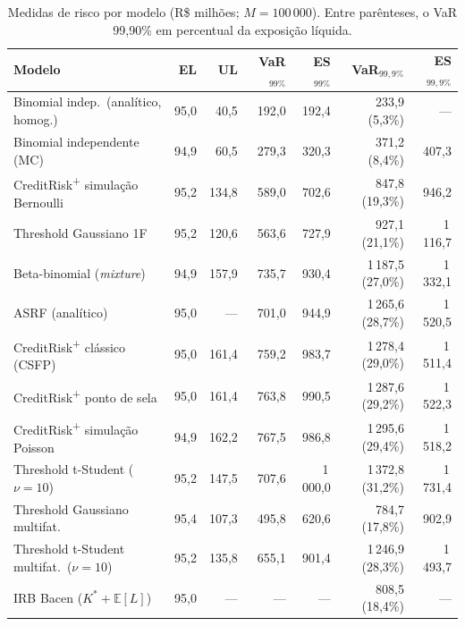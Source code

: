 \documentclass[11pt,a4paper]{article}
\newcommand{\E}{\mathbb{E}}
\begin{document}
\begin{table}[htb]
\centering\small
\caption{Medidas de risco por modelo (R\$ milhões; $M=100\,000$). Entre parênteses, o VaR 99{,}90\% em percentual da exposição líquida.}
\label{tab:medidas}
\setlength{\tabcolsep}{4.5pt}
\begin{tabular}{lrrrrrr}
\toprule
Modelo & EL & UL & VaR$_{99\%}$ & ES$_{99\%}$ & VaR$_{99,9\%}$ & ES$_{99,9\%}$ \\
\midrule
Binomial indep.\ (analítico, homog.) & 95{,}0 & 40{,}5 & 192{,}0 & 192{,}4 & 233{,}9 \;(5{,}3\%) & --- \\
Binomial independente (MC) & 94{,}9 & 60{,}5 & 279{,}3 & 320{,}3 & 371{,}2 \;(8{,}4\%) & 407{,}3 \\
CreditRisk\textsuperscript{+} simulação Bernoulli & 95{,}2 & 134{,}8 & 589{,}0 & 702{,}6 & 847{,}8 \;(19{,}3\%) & 946{,}2 \\
Threshold Gaussiano 1F & 95{,}2 & 120{,}6 & 563{,}6 & 727{,}9 & 927{,}1 \;(21{,}1\%) & 1\,116{,}7 \\
Beta-binomial (\emph{mixture}) & 94{,}9 & 157{,}9 & 735{,}7 & 930{,}4 & 1\,187{,}5 \;(27{,}0\%) & 1\,332{,}1 \\
ASRF (analítico) & 95{,}0 & --- & 701{,}0 & 944{,}9 & 1\,265{,}6 \;(28{,}7\%) & 1\,520{,}5 \\
CreditRisk\textsuperscript{+} clássico (CSFP) & 95{,}0 & 161{,}4 & 759{,}2 & 983{,}7 & 1\,278{,}4 \;(29{,}0\%) & 1\,511{,}4 \\
CreditRisk\textsuperscript{+} ponto de sela & 95{,}0 & 161{,}4 & 763{,}8 & 990{,}5 & 1\,287{,}6 \;(29{,}2\%) & 1\,522{,}3 \\
CreditRisk\textsuperscript{+} simulação Poisson & 94{,}9 & 162{,}2 & 767{,}5 & 986{,}8 & 1\,295{,}6 \;(29{,}4\%) & 1\,518{,}2 \\
Threshold t-Student ($\nu=10$) & 95{,}2 & 147{,}5 & 707{,}6 & 1\,000{,}0 & 1\,372{,}8 \;(31{,}2\%) & 1\,731{,}4 \\
\midrule
Threshold Gaussiano multifat.\ & 95{,}4 & 107{,}3 & 495{,}8 & 620{,}6 & 784{,}7 \;(17{,}8\%) & 902{,}9 \\
Threshold t-Student multifat.\ ($\nu=10$) & 95{,}2 & 135{,}8 & 655{,}1 & 901{,}4 & 1\,246{,}9 \;(28{,}3\%) & 1\,493{,}7 \\
\midrule
IRB Bacen ($K^{*}+\E[L]$) & 95{,}0 & --- & --- & --- & 808{,}5 \;(18{,}4\%) & --- \\
\bottomrule
\end{tabular}
\end{table}
\end{document}
